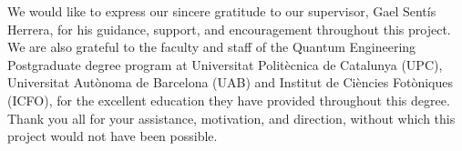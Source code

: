 We would like to express our sincere gratitude to our supervisor, Gael Sent\'is Herrera, for his guidance, support, and encouragement throughout this project. We are also grateful to the faculty and staff of the Quantum Engineering Postgraduate degree program at Universitat Polit\`ecnica de Catalunya (UPC), Universitat Aut\`onoma de Barcelona (UAB) and Institut de Ci\`encies Fot\`oniques (ICFO), for the excellent education they have provided throughout this degree. Thank you all for your assistance, motivation, and direction, without which this project would not have been possible.